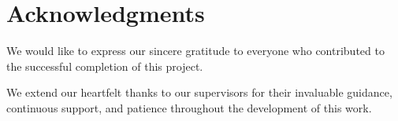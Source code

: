 \chapter*{Acknowledgments}

We would like to express our sincere gratitude to everyone who contributed to
the successful completion of this project.

\lipsum[4]

We extend our heartfelt thanks to our supervisors for their invaluable guidance,
continuous support, and patience throughout the development of this work.

\lipsum[5]
